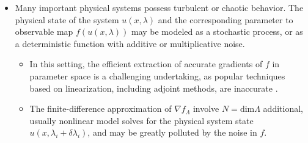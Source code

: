 \documentclass[11pt]{beamer}
\begin{document}
\begin{frame}

\begin{itemize}

\item Many important physical systems possess turbulent or chaotic behavior.  The physical state of the system $u(x,\lambda)$ and the corresponding parameter
to observable map $f(u(x,\lambda))$ may be modeled as a stochastic process, or as a deterministic function with additive or multiplicative noise.  

\begin{itemize}


\item In this setting, the efficient extraction of accurate gradients of $f$ in parameter space is a challenging undertaking, as popular techniques based on
linearization, including adjoint methods, are inaccurate \footnotemark[1] \footnotemark[2].  

\item The finite-difference approximation of $\nabla f_\Lambda$ 
involve $N=\text{dim}\Lambda$ 
additional, usually nonlinear model solves for the physical system state $u(x,\lambda_i + \delta \lambda_i)$, and may be greatly polluted by the noise in $f$.

\end{itemize}


\end{itemize}


\end{frame}
\end{document}
